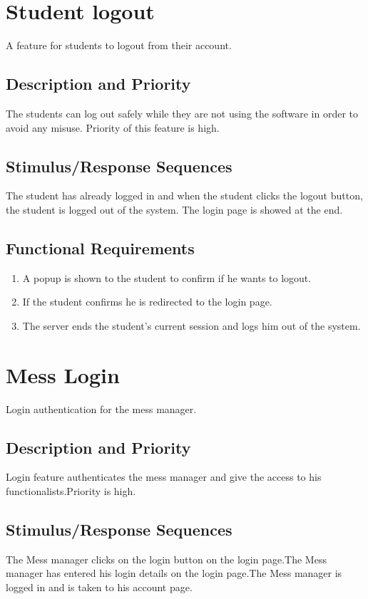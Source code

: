\documentclass{scrreprt}
\begin{document}
\section{Student logout}
A feature for students to logout from their account.

\subsection{Description and Priority}
The students can log out safely while they are not using the software in order to avoid any misuse. Priority of this feature is high.

\subsection{Stimulus/Response Sequences}
The student has already logged in and when the student clicks the logout button, the student is logged out of the system. The login page is showed at the end.

\subsection{Functional Requirements}
\begin{enumerate}
\item A popup is shown to the student to confirm if he wants to logout.
\item If the student confirms he is redirected to the login page.
\item The server ends the student's current session and logs him out of the system.
\end{enumerate}

\section{Mess Login}
Login authentication for the mess manager. 


\subsection{Description and Priority}
Login feature authenticates the mess manager and give the access to his functionalists.Priority is high.

\subsection{Stimulus/Response Sequences}
The Mess manager clicks on the login button on the login  page.The Mess manager has entered his login details on the login
page.The Mess manager is logged in and is taken to his account page.
\end{document}
